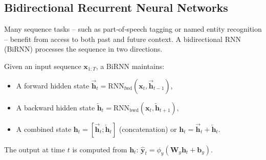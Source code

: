 \documentclass{tufte-handout}
\begin{document}
\subsection{Bidirectional Recurrent Neural Networks}

Many sequence tasks – such as part‑of‑speech tagging or named entity recognition – benefit from access to both past and future context. A bidirectional RNN (BiRNN) processes the sequence in two directions.

\begin{defn}
    Given an input sequence $\mathbf{x}_{1:T}$, a BiRNN maintains:
    \begin{itemize}
        \item A forward hidden state $\overrightarrow{\mathbf{h}}_t = \text{RNN}_{\text{fwd}}(\mathbf{x}_t, \overrightarrow{\mathbf{h}}_{t-1})$,
        \item A backward hidden state $\overleftarrow{\mathbf{h}}_t = \text{RNN}_{\text{bwd}}(\mathbf{x}_t, \overleftarrow{\mathbf{h}}_{t+1})$,
        \item A combined state $\mathbf{h}_t = [\overrightarrow{\mathbf{h}}_t; \overleftarrow{\mathbf{h}}_t]$ (concatenation) or $\mathbf{h}_t = \overrightarrow{\mathbf{h}}_t + \overleftarrow{\mathbf{h}}_t$.
    \end{itemize}
    The output at time $t$ is computed from $\mathbf{h}_t$: $\hat{\mathbf{y}}_t = \phi_y(\mathbf{W}_y \mathbf{h}_t + \mathbf{b}_y)$.
\end{defn}

\begin{marginfigure}
\centering
{}
\caption{Bidirectional RNN: forward (top) and backward (bottom) states are combined.}
\end{marginfigure}
\end{document}
